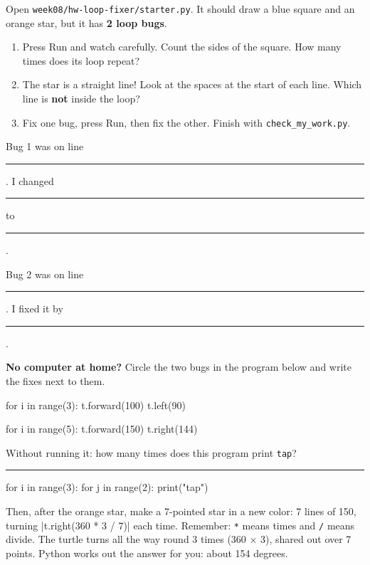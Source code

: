 \namedateline

\begin{core}
Open \texttt{week08/hw-loop-fixer/starter.py}. It should draw a blue square and an orange star, but it has \textbf{2 loop bugs}.
\begin{enumerate}[leftmargin=1.4em,itemsep=1pt]
  \item Press Run and watch carefully. Count the sides of the square. How many times does its loop repeat?
  \item The star is a straight line! Look at the spaces at the start of each line. Which line is \textbf{not} inside the loop?
  \item Fix one bug, press Run, then fix the other. Finish with \texttt{check\_my\_work.py}.
\end{enumerate}
Bug 1 was on line \rule{1cm}{0.4pt}. I changed \rule{3.5cm}{0.4pt} to \rule{3.5cm}{0.4pt}.\par\smallskip
Bug 2 was on line \rule{1cm}{0.4pt}. I fixed it by \rule{7cm}{0.4pt}.
\par\textbf{No computer at home?} Circle the two bugs in the program below and write the fixes next to them.
\begin{pycode}
for i in range(3):
    t.forward(100)
    t.left(90)

for i in range(5):
    t.forward(150)
t.right(144)
\end{pycode}
\end{core}

\begin{challenge}
Without running it: how many times does this program print \texttt{tap}? \rule{1.5cm}{0.4pt}
\begin{pycode}
for i in range(3):
    for j in range(2):
        print("tap")
\end{pycode}
Then, after the orange star, make a 7-pointed star in a new color: 7 lines of 150, turning \py|t.right(360 * 3 / 7)| each time. Remember: \texttt{*} means times and \texttt{/} means divide. The turtle turns all the way round 3 times (360 × 3), shared out over 7 points. Python works out the answer for you: about 154 degrees.
\end{challenge}


